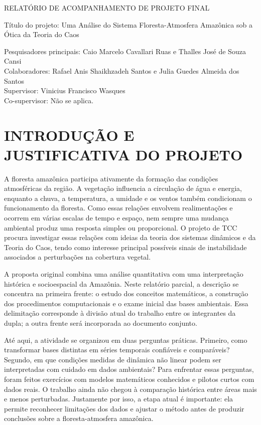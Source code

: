 \documentclass[12pt,a4paper]{article}
\begin{document}
\vspace*{0.25cm}
\begin{center}
RELATÓRIO DE ACOMPANHAMENTO DE PROJETO FINAL
\end{center}
\vspace{0.45cm}

Título do projeto: Uma Análise do Sistema Floresta-Atmosfera Amazônica sob a Ótica da Teoria do Caos

\vspace{0.45cm}
Pesquisadores principais: Caio Marcelo Cavallari Ruas e Thalles José de Souza Cansi\\
Colaboradores: Rafael Anis Shaikhzadeh Santos e Julia Guedes Almeida dos Santos\\
Supervisor: Vinicius Francisco Wasques\\
Co-supervisor: Não se aplica.

\section*{INTRODUÇÃO E JUSTIFICATIVA DO PROJETO}

A floresta amazônica participa ativamente da formação das condições atmosféricas da região. A vegetação influencia a circulação de água e energia, enquanto a chuva, a temperatura, a umidade e os ventos também condicionam o funcionamento da floresta. Como essas relações envolvem realimentações e ocorrem em várias escalas de tempo e espaço, nem sempre uma mudança ambiental produz uma resposta simples ou proporcional. O projeto de TCC procura investigar essas relações com ideias da teoria dos sistemas dinâmicos e da Teoria do Caos, tendo como interesse principal possíveis sinais de instabilidade associados a perturbações na cobertura vegetal.

A proposta original combina uma análise quantitativa com uma interpretação histórica e socioespacial da Amazônia. Neste relatório parcial, a descrição se concentra na primeira frente: o estudo dos conceitos matemáticos, a construção dos procedimentos computacionais e o exame inicial das bases ambientais. Essa delimitação corresponde à divisão atual do trabalho entre os integrantes da dupla; a outra frente será incorporada ao documento conjunto.

Até aqui, a atividade se organizou em duas perguntas práticas. Primeiro, como transformar bases distintas em séries temporais confiáveis e comparáveis? Segundo, em que condições medidas de dinâmica não linear podem ser interpretadas com cuidado em dados ambientais? Para enfrentar essas perguntas, foram feitos exercícios com modelos matemáticos conhecidos e pilotos curtos com dados reais. O trabalho ainda não chegou à comparação histórica entre áreas mais e menos perturbadas. Justamente por isso, a etapa atual é importante: ela permite reconhecer limitações dos dados e ajustar o método antes de produzir conclusões sobre a floresta-atmosfera amazônica.
\end{document}
